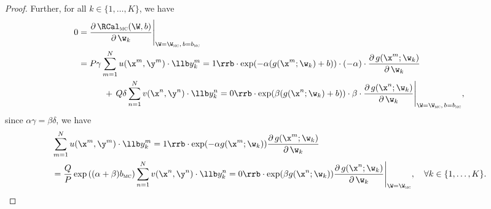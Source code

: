 \begin{proof}
Further, for all $k \in \{1,\dots,K\}$, we have
\begin{equation*}
\begin{aligned}
0 
&= \frac{\partial \, \RCal_\textsc{mc}(\W, b)} {\partial \, \w_k} \Bigg|_{\W = \W_\textsc{mc}, \, b = b_\textsc{mc}} \\
&= P \gamma \sum_{m=1}^N u(\x^m, \y^m) \cdot \llb y_k^m = 1 \rrb \cdot \exp(-\alpha (g(\x^m; \w_k) + b)) \cdot (-\alpha) \cdot 
     \frac{\partial \, g(\x^m; \w_k)}{\partial \, \w_k} \\
&  \hspace{3em} + \,
   Q \delta \sum_{n=1}^N v(\x^n, \y^n) \cdot \llb y_k^n = 0 \rrb \cdot \exp( \beta  (g(\x^n; \w_k) + b)) \cdot \beta \cdot 
     \frac{\partial \, g(\x^n; \w_k)}{\partial \, \w_k} \Bigg|_{\W = \W_\textsc{mc}, \, b = b_\textsc{mc}},
\end{aligned}
\end{equation*}
since $\alpha \gamma = \beta \delta$, we have
\begin{equation}
\label{eq:grad_mc_eq0}
\begin{aligned}
&  \sum_{m=1}^N u(\x^m, \y^m) \cdot \llb y_k^m = 1 \rrb \cdot \exp(-\alpha g(\x^m; \w_k)) \frac{\partial \, g(\x^m; \w_k)}{\partial \, \w_k} \\
&= \frac{Q}{P} \exp \left( (\alpha + \beta) b_\textsc{mc} \right)
   \sum_{n=1}^N v(\x^n, \y^n) \cdot \llb y_k^n = 0 \rrb \cdot \exp(\beta g(\x^n; \w_k))  
   \frac{\partial \, g(\x^n; \w_k)}{\partial \, \w_k} \Bigg|_{\W = \W_\textsc{mc}}, 
   \quad \forall k \in \{1,\dots,K\}.
\end{aligned}
\end{equation}


\end{proof}
